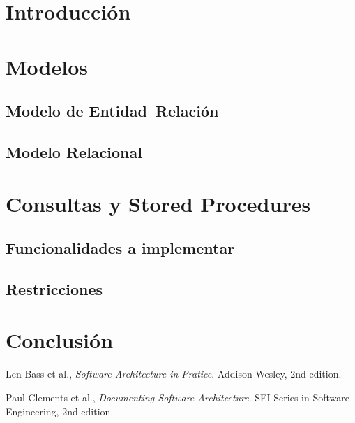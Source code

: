 \documentclass[hidelinks,a4paper,10pt, nofootinbib]{article}
\begin{document}
\maketitle

\tableofcontents
\newpage

\section{Introducción}

\newpage

\section{Modelos}
\subsection{Modelo de Entidad--Relación}

\newpage

\subsection{Modelo Relacional}

\newpage

\section{Consultas y Stored Procedures}
\subsection{Funcionalidades a implementar}

\subsection{Restricciones}

\newpage


\section{Conclusión}

\newpage

\begin{thebibliography}{9}

  Len Bass et al.,
  \emph{Software Architecture in Pratice}.
  Addison-Wesley,
  2nd edition.

  Paul Clements et al.,
  \emph{Documenting Software Architecture}.
  SEI Series in Software Engineering,
  2nd edition.

\end{thebibliography}
\end{document}
